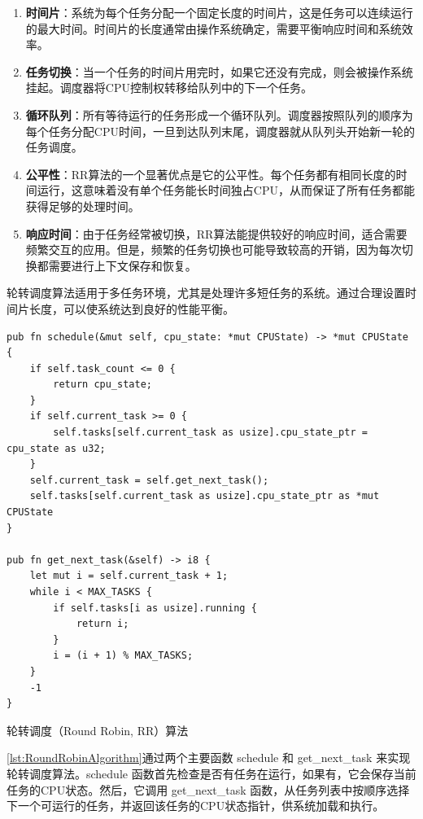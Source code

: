 \begin{enumerate}
    \item \textbf{时间片}：系统为每个任务分配一个固定长度的时间片，这是任务可以连续运行的最大时间。时间片的长度通常由操作系统确定，需要平衡响应时间和系统效率。
    \item \textbf{任务切换}：当一个任务的时间片用完时，如果它还没有完成，则会被操作系统挂起。调度器将CPU控制权转移给队列中的下一个任务。
    \item \textbf{循环队列}：所有等待运行的任务形成一个循环队列。调度器按照队列的顺序为每个任务分配CPU时间，一旦到达队列末尾，调度器就从队列头开始新一轮的任务调度。
    \item \textbf{公平性}：RR算法的一个显著优点是它的公平性。每个任务都有相同长度的时间运行，这意味着没有单个任务能长时间独占CPU，从而保证了所有任务都能获得足够的处理时间。
    \item \textbf{响应时间}：由于任务经常被切换，RR算法能提供较好的响应时间，适合需要频繁交互的应用。但是，频繁的任务切换也可能导致较高的开销，因为每次切换都需要进行上下文保存和恢复。
\end{enumerate}

轮转调度算法适用于多任务环境，尤其是处理许多短任务的系统。通过合理设置时间片长度，可以使系统达到良好的性能平衡。

\begin{listing}[htbp]
    \begin{verbatim}
pub fn schedule(&mut self, cpu_state: *mut CPUState) -> *mut CPUState {
    if self.task_count <= 0 {
        return cpu_state;
    }
    if self.current_task >= 0 {
        self.tasks[self.current_task as usize].cpu_state_ptr = cpu_state as u32;
    }
    self.current_task = self.get_next_task();
    self.tasks[self.current_task as usize].cpu_state_ptr as *mut CPUState
}

pub fn get_next_task(&self) -> i8 {
    let mut i = self.current_task + 1;
    while i < MAX_TASKS {
        if self.tasks[i as usize].running {
            return i;
        }
        i = (i + 1) % MAX_TASKS;
    }
    -1
}
    \end{verbatim}
    \caption{轮转调度（Round Robin, RR）算法}\label{lst:RoundRobinAlgorithm}
\end{listing}

\cref{lst:RoundRobinAlgorithm}通过两个主要函数 schedule 和 get\_next\_task 来实现轮转调度算法。schedule 函数首先检查是否有任务在运行，如果有，它会保存当前任务的CPU状态。然后，它调用 get\_next\_task 函数，从任务列表中按顺序选择下一个可运行的任务，并返回该任务的CPU状态指针，供系统加载和执行。

